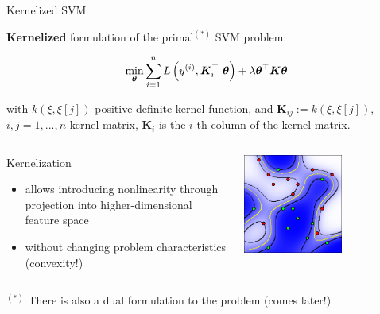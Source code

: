 \documentclass[11pt,compress,t,notes=noshow, xcolor=table]{beamer}
\begin{document}
\begin{vbframe}{Kernelized SVM} 

\textbf{Kernelized} formulation of the primal$^{(*)}$ SVM problem: 

\begin{eqnarray*}
	\min_{\bm{\theta}}\sum\limits_{i=1}^n L\left(y^{(i)}, \bm{K}_i^\top ~\bm{\theta}\right) + \lambda \bm{\theta}^\top \bm{K} \bm{\theta} 
\end{eqnarray*}

with $k(\xi, \xi[j])$ positive definite kernel function, and $\bm{K}_{ij} := k(\xi, \xi[j])$, $i, j = 1, ..., n$ kernel matrix, $\bm{K}_i$ is the $i$-th column of the kernel matrix. 

\vspace*{0.2cm}

\begin{columns}[T] %
	\begin{column}{.6\textwidth} 
        Kernelization 
        
        \begin{itemize}
        	\item allows introducing nonlinearity through projection into higher-dimensional feature space
        	\item without changing problem characteristics (convexity!)
        \end{itemize}
	\end{column}
	\begin{column}{.4\textwidth}
		\begin{center}
				\vspace*{-0.5cm}
		    \includegraphics[width=0.6\textwidth]{figure_man/nonlinear-svm-c.pdf}
		\end{center}
	\end{column}

\end{columns}

\vfill
\begin{footnotesize}
$^{(*)}$ There is also a dual formulation to the problem (comes later!)
\end{footnotesize}



\end{vbframe}
\end{document}
